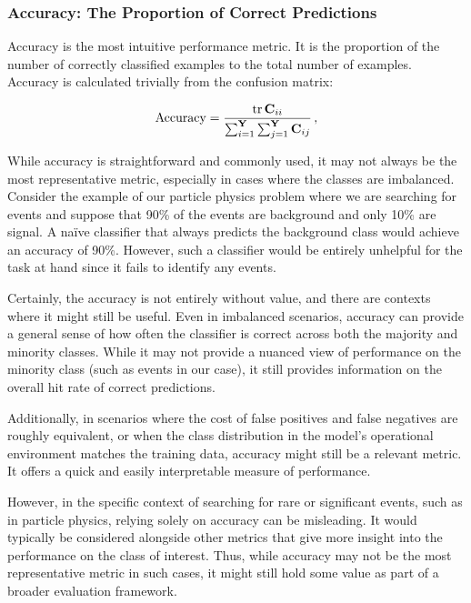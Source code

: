 \subsubsection{Accuracy: The Proportion of Correct Predictions}

Accuracy is the most intuitive performance metric. It is the proportion of the number of correctly classified examples
to the total number of examples. Accuracy is calculated trivially from the confusion matrix:

\begin{align}
    \acc  = \frac{\trace \C_{ii}}{\sum_{i=1}^\classY \sum_{j=1}^\classY \C_{ij}}\,,
\end{align}

While accuracy is straightforward and commonly used, it may not always be the most representative metric, especially in
cases where the classes are imbalanced. Consider the example of our particle physics problem where we are searching for
\tth events and suppose that 90\% of the events are background and only 10\% are signal. A naïve classifier that
always predicts the background class would achieve an accuracy of 90\%. However, such a classifier would be entirely
unhelpful for the task at hand since it fails to identify any \tth events.

Certainly, the accuracy is not entirely without value, and there are contexts where it might still be useful. Even in
imbalanced scenarios, accuracy can provide a general sense of how often the classifier is correct across both the
majority and minority classes. While it may not provide a nuanced view of performance on the minority class (such as
\tth events in our case), it still provides information on the overall hit rate of correct predictions.

Additionally, in scenarios where the cost of false positives and false negatives are roughly equivalent, or when the
class distribution in the model's operational environment matches the training data, accuracy might still be a relevant
metric. It offers a quick and easily interpretable measure of performance.

However, in the specific context of searching for rare or significant events, such as \tth in particle physics, relying
solely on accuracy can be misleading. It would typically be considered alongside other metrics that give more insight
into the performance on the class of interest. Thus, while accuracy may not be the most representative metric in such
cases, it might still hold some value as part of a broader evaluation framework.

